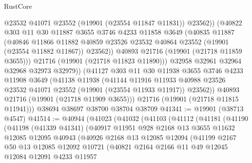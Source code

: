 \begin{lexlean}{RustCore}
\begin{coremodule}
                @23532
                @41071
                @23552
                (@19901 (@23554 @11847 @11831))
                @23562))
            (@40822
              @303
              @11
              @30
              @11887
              @3655
              @3746
              @4233
              @11858
              @3649
              (@40835
                @11887
                (@40846
                  @11866
                  @11882
                  @40859
                  @23526
                  @23532
                  @40864
                  @23552
                  (@19901 (@23554 @11882 @11867))
                  @23562))
              @40893
              @21716
              (@19901 (@21718 @11859 @3655)))
            @21716
            (@19901 (@21718 @11823 @11890)))
          @32958
          @32961
          @32964
          @32968
          @32973
          @32979))
      (@41127
        @303
        @11
        @30
        @11938
        @3655
        @3746
        @4233
        @11908
        @3649
        (@41138
          @11938
          (@41144
            @11916
            @11933
            @40988
            @23526
            @23532
            @41071
            @23552
            (@19901 (@23554 @11933 @11917))
            @23562))
        @40893
        @21716
        (@19901 (@21718 @11909 @3655)))
      @21716
      (@19901 (@21718 @11815 @11941)))
    @38694
    @38697
    @38700
    @38704
    @38709
@41341 := @19901 (@38713 @4547)
@41514 := @40944
    (@41023
      (@41032
        (@41103
          (@41112
            (@41181
              (@41190
                (@41198
                  (@41339 @41341)
                  (@40917
                    @11951
                    @928
                    @2168
                    @13
                    @3655
                    @11632
                    @12085
                    @12095
                    @40943
                    (@40926
                      @2168
                      @13
                      @12085
                      @12094
                      (@41199
                        @2167
                        @50
                        @13
                        @12085
                        @12092
                        @10721
                        (@40821
                          @2164
                          @2166
                          @11
                          @49
                          @12045
                          @12084
                          @12091
                          @4233
                          @11957

\end{coremodule}
\end{lexlean}
